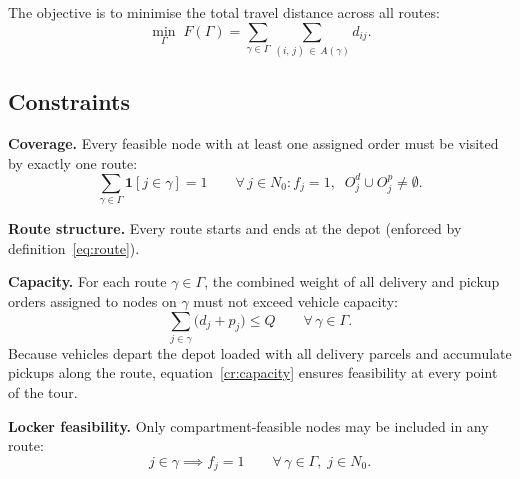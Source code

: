 The objective is to minimise the total travel distance across all routes:
\begin{equation}
    \min_{\Gamma}\; F(\Gamma) = \sum_{\gamma \in \Gamma}
    \sum_{(i,\,j)\,\in\, A(\gamma)} d_{ij}.
    \label{eq:objective}
\end{equation}

\subsection{Constraints}

\textbf{Coverage.} Every feasible node with at least one assigned order must be
visited by exactly one route:
\begin{equation}
    \sum_{\gamma \in \Gamma} \mathbf{1}[j \in \gamma] = 1 \qquad
    \forall\, j \in N_0 : f_j = 1,\;\; O_j^d \cup O_j^p \neq \emptyset.
    \label{cr:coverage}
\end{equation}

\textbf{Route structure.} Every route starts and ends at the depot (enforced by
definition~\eqref{eq:route}).

\textbf{Capacity.} For each route $\gamma \in \Gamma$, the combined weight of
all delivery and pickup orders assigned to nodes on $\gamma$ must not exceed
vehicle capacity:
\begin{equation}
    \sum_{j \in \gamma} \bigl(d_j + p_j\bigr) \leq Q \qquad \forall\, \gamma \in \Gamma.
    \label{cr:capacity}
\end{equation}
Because vehicles depart the depot loaded with all delivery parcels and
accumulate pickups along the route, equation~\eqref{cr:capacity} ensures
feasibility at every point of the tour.

\textbf{Locker feasibility.} Only compartment-feasible nodes may be included in
any route:
\begin{equation}
    j \in \gamma \implies f_j = 1 \qquad \forall\, \gamma \in \Gamma,\;
    j \in N_0.
    \label{cr:feasibility}
\end{equation}

%
%
